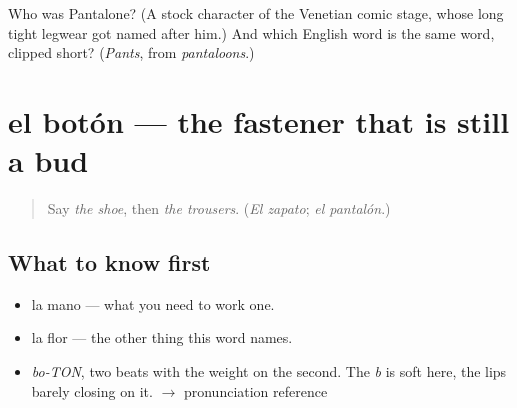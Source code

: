 \begin{tcolorbox}[breakable,colback=teal!4,colframe=teal!35!black,title={Before you move on}]
Who was Pantalone? (A stock character of the Venetian comic stage, whose long tight legwear got named after him.) And which English word is the same word, clipped short? (\emph{Pants}, from \emph{pantaloons}.)
\end{tcolorbox}
\section[el botón]{el botón — the fastener that is still a bud}

\label{lesson:ES-C360-boton}



\begin{quote}
Say \emph{the shoe}, then \emph{the trousers}. (\emph{El zapato}; \emph{el pantalón}.)
\end{quote}

\subsection*{What to know first}
\begin{itemize}
\raggedright
  \item la mano — what you need to work one.
  \item la flor — the other thing this word names.
\end{itemize}

\begin{sounds}
\begin{itemize}
\raggedright
  \item \emph{bo-TON}, two beats with the weight on the second. The \emph{b} is soft here, the lips barely closing on it. $\to$ pronunciation reference
\end{itemize}
\end{sounds}

